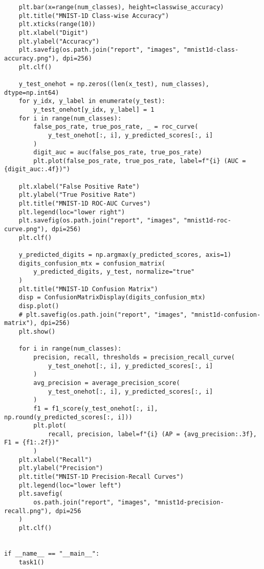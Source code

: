 \documentclass{article}
\begin{document}
\begin{lstlisting}
    plt.bar(x=range(num_classes), height=classwise_accuracy)
    plt.title("MNIST-1D Class-wise Accuracy")
    plt.xticks(range(10))
    plt.xlabel("Digit")
    plt.ylabel("Accuracy")
    plt.savefig(os.path.join("report", "images", "mnist1d-class-accuracy.png"), dpi=256)
    plt.clf()

    y_test_onehot = np.zeros((len(x_test), num_classes), dtype=np.int64)
    for y_idx, y_label in enumerate(y_test):
        y_test_onehot[y_idx, y_label] = 1
    for i in range(num_classes):
        false_pos_rate, true_pos_rate, _ = roc_curve(
            y_test_onehot[:, i], y_predicted_scores[:, i]
        )
        digit_auc = auc(false_pos_rate, true_pos_rate)
        plt.plot(false_pos_rate, true_pos_rate, label=f"{i} (AUC = {digit_auc:.4f})")

    plt.xlabel("False Positive Rate")
    plt.ylabel("True Positive Rate")
    plt.title("MNIST-1D ROC-AUC Curves")
    plt.legend(loc="lower right")
    plt.savefig(os.path.join("report", "images", "mnist1d-roc-curve.png"), dpi=256)
    plt.clf()

    y_predicted_digits = np.argmax(y_predicted_scores, axis=1)
    digits_confusion_mtx = confusion_matrix(
        y_predicted_digits, y_test, normalize="true"
    )
    plt.title("MNIST-1D Confusion Matrix")
    disp = ConfusionMatrixDisplay(digits_confusion_mtx)
    disp.plot()
    # plt.savefig(os.path.join("report", "images", "mnist1d-confusion-matrix"), dpi=256)
    plt.show()

    for i in range(num_classes):
        precision, recall, thresholds = precision_recall_curve(
            y_test_onehot[:, i], y_predicted_scores[:, i]
        )
        avg_precision = average_precision_score(
            y_test_onehot[:, i], y_predicted_scores[:, i]
        )
        f1 = f1_score(y_test_onehot[:, i], np.round(y_predicted_scores[:, i]))
        plt.plot(
            recall, precision, label=f"{i} (AP = {avg_precision:.3f}, F1 = {f1:.2f})"
        )
    plt.xlabel("Recall")
    plt.ylabel("Precision")
    plt.title("MNIST-1D Precision-Recall Curves")
    plt.legend(loc="lower left")
    plt.savefig(
        os.path.join("report", "images", "mnist1d-precision-recall.png"), dpi=256
    )
    plt.clf()


if __name__ == "__main__":
    task1()
\end{lstlisting}

\small


\end{document}
